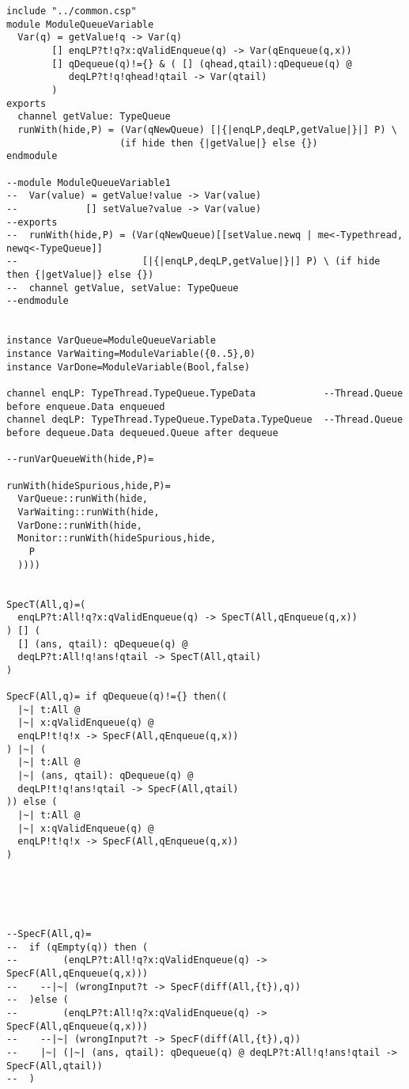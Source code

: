 \begin{lstlisting}
include "../common.csp"
module ModuleQueueVariable
  Var(q) = getValue!q -> Var(q)
        [] enqLP?t!q?x:qValidEnqueue(q) -> Var(qEnqueue(q,x))
        [] qDequeue(q)!={} & ( [] (qhead,qtail):qDequeue(q) @
           deqLP?t!q!qhead!qtail -> Var(qtail)
        )
exports
  channel getValue: TypeQueue
  runWith(hide,P) = (Var(qNewQueue) [|{|enqLP,deqLP,getValue|}|] P) \
                    (if hide then {|getValue|} else {})
endmodule

--module ModuleQueueVariable1
--  Var(value) = getValue!value -> Var(value)
--            [] setValue?value -> Var(value)
--exports
--  runWith(hide,P) = (Var(qNewQueue)[[setValue.newq | me<-Typethread, newq<-TypeQueue]]
--                      [|{|enqLP,deqLP,getValue|}|] P) \ (if hide then {|getValue|} else {})
--  channel getValue, setValue: TypeQueue
--endmodule


instance VarQueue=ModuleQueueVariable
instance VarWaiting=ModuleVariable({0..5},0)
instance VarDone=ModuleVariable(Bool,false)

channel enqLP: TypeThread.TypeQueue.TypeData            --Thread.Queue before enqueue.Data enqueued
channel deqLP: TypeThread.TypeQueue.TypeData.TypeQueue  --Thread.Queue before dequeue.Data dequeued.Queue after dequeue

--runVarQueueWith(hide,P)=

runWith(hideSpurious,hide,P)=
  VarQueue::runWith(hide,
  VarWaiting::runWith(hide,
  VarDone::runWith(hide,
  Monitor::runWith(hideSpurious,hide,
    P
  ))))


SpecT(All,q)=(
  enqLP?t:All!q?x:qValidEnqueue(q) -> SpecT(All,qEnqueue(q,x))
) [] (
  [] (ans, qtail): qDequeue(q) @
  deqLP?t:All!q!ans!qtail -> SpecT(All,qtail)
) 

SpecF(All,q)= if qDequeue(q)!={} then((
  |~| t:All @
  |~| x:qValidEnqueue(q) @
  enqLP!t!q!x -> SpecF(All,qEnqueue(q,x))
) |~| (
  |~| t:All @
  |~| (ans, qtail): qDequeue(q) @
  deqLP!t!q!ans!qtail -> SpecF(All,qtail)
)) else (
  |~| t:All @
  |~| x:qValidEnqueue(q) @
  enqLP!t!q!x -> SpecF(All,qEnqueue(q,x))  
)





--SpecF(All,q)=
--  if (qEmpty(q)) then (
--        (enqLP?t:All!q?x:qValidEnqueue(q) -> SpecF(All,qEnqueue(q,x)))
--    --|~| (wrongInput?t -> SpecF(diff(All,{t}),q)) 
--  )else (
--        (enqLP?t:All!q?x:qValidEnqueue(q) -> SpecF(All,qEnqueue(q,x)))
--    --|~| (wrongInput?t -> SpecF(diff(All,{t}),q))
--    |~| (|~| (ans, qtail): qDequeue(q) @ deqLP?t:All!q!ans!qtail -> SpecF(All,qtail))
--  )
\end{lstlisting}
